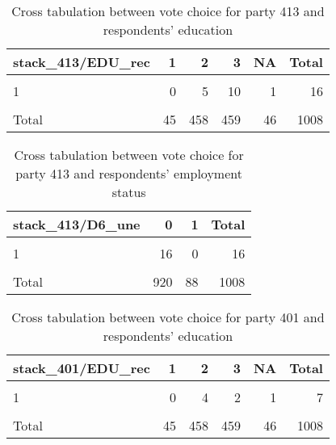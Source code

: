 \documentclass[
]{article}
\begin{document}
\begin{table}

\caption{\label{tab:unnamed-chunk-35}Cross tabulation between vote choice for party 413 and respondents' education 
                   \label{table:crosstab_1_hr}}
\centering
\begin{tabular}[t]{l|r|r|r|r|r}
\hline
stack\_413/EDU\_rec & 1 & 2 & 3 & NA & Total\\
\hline
\cellcolor{gray!6}{0} & \cellcolor{gray!6}{41} & \cellcolor{gray!6}{434} & \cellcolor{gray!6}{440} & \cellcolor{gray!6}{44} & \cellcolor{gray!6}{959}\\
\hline
1 & 0 & 5 & 10 & 1 & 16\\
\hline
\cellcolor{gray!6}{NA} & \cellcolor{gray!6}{4} & \cellcolor{gray!6}{19} & \cellcolor{gray!6}{9} & \cellcolor{gray!6}{1} & \cellcolor{gray!6}{33}\\
\hline
Total & 45 & 458 & 459 & 46 & 1008\\
\hline
\end{tabular}
\end{table}

\begin{table}

\caption{\label{tab:unnamed-chunk-35}Cross tabulation between vote choice for party 413 and respondents' employment status
                   \label{table:crosstab_2_hr}}
\centering
\begin{tabular}[t]{l|r|r|r}
\hline
stack\_413/D6\_une & 0 & 1 & Total\\
\hline
\cellcolor{gray!6}{0} & \cellcolor{gray!6}{875} & \cellcolor{gray!6}{84} & \cellcolor{gray!6}{959}\\
\hline
1 & 16 & 0 & 16\\
\hline
\cellcolor{gray!6}{NA} & \cellcolor{gray!6}{29} & \cellcolor{gray!6}{4} & \cellcolor{gray!6}{33}\\
\hline
Total & 920 & 88 & 1008\\
\hline
\end{tabular}
\end{table}

\begin{table}

\caption{\label{tab:unnamed-chunk-35}Cross tabulation between vote choice for party 401 and respondents' education
                   \label{table:crosstab_3_hr}}
\centering
\begin{tabular}[t]{l|r|r|r|r|r}
\hline
stack\_401/EDU\_rec & 1 & 2 & 3 & NA & Total\\
\hline
\cellcolor{gray!6}{0} & \cellcolor{gray!6}{41} & \cellcolor{gray!6}{435} & \cellcolor{gray!6}{448} & \cellcolor{gray!6}{44} & \cellcolor{gray!6}{968}\\
\hline
1 & 0 & 4 & 2 & 1 & 7\\
\hline
\cellcolor{gray!6}{NA} & \cellcolor{gray!6}{4} & \cellcolor{gray!6}{19} & \cellcolor{gray!6}{9} & \cellcolor{gray!6}{1} & \cellcolor{gray!6}{33}\\
\hline
Total & 45 & 458 & 459 & 46 & 1008\\
\hline
\end{tabular}
\end{table}
\end{document}
